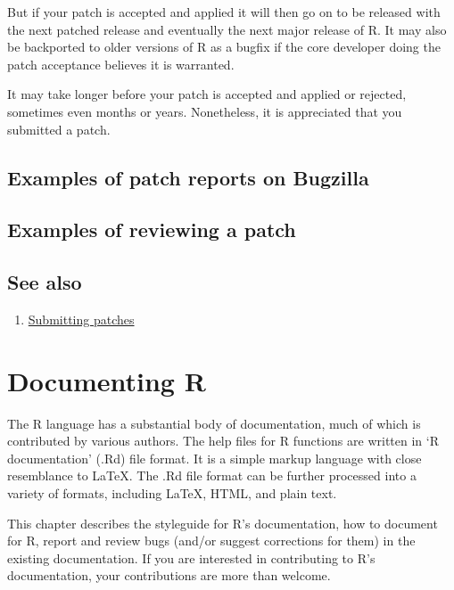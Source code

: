 \documentclass[
]{book}
\providecommand{\tightlist}{%
  \setlength{\itemsep}{0pt}\setlength{\parskip}{0pt}}
\begin{document}
But if your patch is accepted and applied it will then go on to be released with the next patched release and eventually the next major release of R. It may also be backported to older versions of R as a bugfix if the core developer doing the patch acceptance believes it is warranted.

It may take longer before your patch is accepted and applied or rejected, sometimes even months or years. Nonetheless, it is appreciated that you submitted a patch.

\hypertarget{examples-of-patch-reports-on-bugzilla}{%
\section{Examples of patch reports on Bugzilla}\label{examples-of-patch-reports-on-bugzilla}}

\hypertarget{examples-of-reviewing-a-patch}{%
\section{Examples of reviewing a patch}\label{examples-of-reviewing-a-patch}}

\hypertarget{see-also-4}{%
\section{See also}\label{see-also-4}}

\begin{enumerate}
\def\labelenumi{\arabic{enumi}.}
\tightlist
\item
  \href{https://www.r-project.org/bugs.html\#how-to-submit-patches}{Submitting patches}
\end{enumerate}

\hypertarget{Doc}{%
\chapter{Documenting R}\label{Doc}}

The R language has a substantial body of documentation, much of which is contributed by various authors. The help files for R functions are written in `R documentation' (.Rd) file format. It is a simple markup language with close resemblance to LaTeX. The .Rd file format can be further processed into a variety of formats, including LaTeX, HTML, and plain text.

This chapter describes the styleguide for R's documentation, how to document for R, report and review bugs (and/or suggest corrections for them) in the existing documentation. If you are interested in contributing to R's documentation, your contributions are more than welcome.
\end{document}
